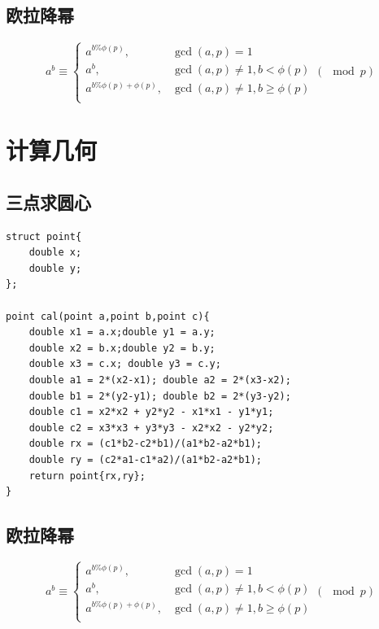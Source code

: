 \documentclass[a4]{ctexart}
\begin{document}
\subsection{欧拉降幂}
$$
a^b \equiv \begin{cases}
a^{b\%\phi(p)} , & \gcd(a,p)=1\\
a^b , & \gcd(a,p)\neq 1,b<\phi(p)\\
a^{b\%\phi(p)+\phi(p)} , & \gcd(a,p)\neq 1 , b\geq \phi(p)\\
\end{cases}
(\mod p)
$$

\section{计算几何}

\subsection{三点求圆心}
\begin{lstlisting}
struct point{
	double x;
	double y;
};

point cal(point a,point b,point c){
	double x1 = a.x;double y1 = a.y;
	double x2 = b.x;double y2 = b.y;
	double x3 = c.x; double y3 = c.y;
	double a1 = 2*(x2-x1); double a2 = 2*(x3-x2);
	double b1 = 2*(y2-y1); double b2 = 2*(y3-y2);
	double c1 = x2*x2 + y2*y2 - x1*x1 - y1*y1;
	double c2 = x3*x3 + y3*y3 - x2*x2 - y2*y2;
	double rx = (c1*b2-c2*b1)/(a1*b2-a2*b1);
	double ry = (c2*a1-c1*a2)/(a1*b2-a2*b1);
	return point{rx,ry};
}
\end{lstlisting}

\subsection{欧拉降幂}
$$
a^b \equiv \begin{cases}
a^{b\%\phi(p)} , & \gcd(a,p)=1\\
a^b , & \gcd(a,p)\neq 1,b<\phi(p)\\
a^{b\%\phi(p)+\phi(p)} , & \gcd(a,p)\neq 1 , b\geq \phi(p)\\
\end{cases}
(\mod p)
$$
\end{document}
